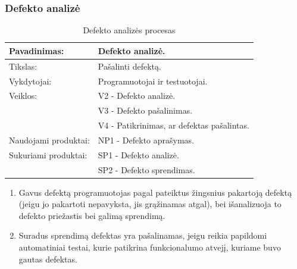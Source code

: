 \documentclass{VUMIFPSkursinis}
\begin{document}
	\subsubsection{Defekto analizė}
	\begin{center}
		\begin{table}[ht]
		\caption{Defekto analizės procesas}
		\begin{tabular}{ | l | l | } 
		\hline
		Pavadinimas:         & Defekto analizė.                               \\ \hline
		Tikslas: 	           & Pašalinti defektą.\\ \hline
		Vykdytojai:          & Programuotojai ir testuotojai.                                \\ \hline
		Veiklos:             & V2 - Defekto analizė. \\ 
									  & V3 - Defekto pašalinimas. 																			 \\ 
									  & V4 - Patikrinimas, ar defektas pašalintas. \\ \hline
		Naudojami produktai: & NP1 - Defekto aprašymas.																											 \\ \hline
		Sukuriami produktai: & SP1 - Defekto analizė.																											\\ 
												& SP2 - Defekto sprendimas. \\ \hline
		\end{tabular}
	\end{table}
		\end{center}
		\begin{enumerate}
			\item Gavus defektą programuotojas pagal pateiktus žingsnius pakartoją defektą (jeigu jo pakartoti nepavyksta, jis grąžinamas atgal), bei išanalizuoja to defekto priežastis bei galimą sprendimą.
			\item Suradus sprendimą defektas yra pašalinamas, jeigu reikia papildomi automatiniai testai, kurie patikrina funkcionalumo atvejį, kuriame buvo gautas defektas.
		\end{enumerate}
\end{document}
